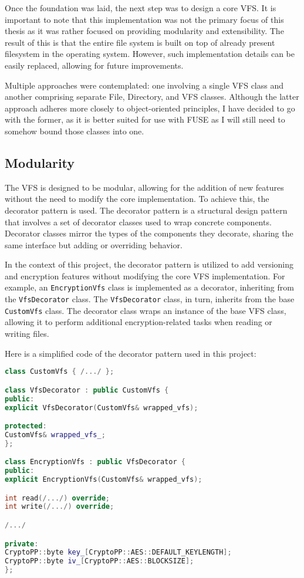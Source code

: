 Once the foundation was laid, the next step was to design a core VFS\@.
It is important to note that this implementation was not the primary focus of this thesis as it was rather focused on providing modularity and extensibility.
The result of this is that the entire file system is built on top of already present filesystem in the operating system.
However, such implementation details can be easily replaced, allowing for future improvements.

Multiple approaches were contemplated: one involving a single VFS class and another comprising separate File, Directory, and VFS classes.
Although the latter approach adheres more closely to object-oriented principles, I have decided to go with the former, as it is better suited for use with FUSE as I will still need to somehow bound those classes into one.

\subsection{Modularity}\label{subsec:modularity}

The VFS is designed to be modular, allowing for the addition of new features without the need to modify the core implementation.
To achieve this, the decorator pattern is used.
The decorator pattern is a structural design pattern that involves a set of decorator classes used to wrap concrete components.
Decorator classes mirror the types of the components they decorate, sharing the same interface but adding or overriding behavior.

In the context of this project, the decorator pattern is utilized to add versioning and encryption features without modifying the core VFS implementation.
For example, an \texttt{EncryptionVfs} class is implemented as a decorator, inheriting from the \texttt{VfsDecorator} class.
The \texttt{VfsDecorator} class, in turn, inherits from the base \texttt{CustomVfs} class.
The decorator class wraps an instance of the base VFS class, allowing it to perform additional encryption-related tasks when reading or writing files.

Here is a simplified code of the decorator pattern used in this project:

\begin{lstlisting}[language=c++, basicstyle=\ttfamily\small]
class CustomVfs { /.../ };

class VfsDecorator : public CustomVfs {
public:
explicit VfsDecorator(CustomVfs& wrapped_vfs);

protected:
CustomVfs& wrapped_vfs_;
};

class EncryptionVfs : public VfsDecorator {
public:
explicit EncryptionVfs(CustomVfs& wrapped_vfs);

int read(/.../) override;
int write(/.../) override;

/.../

private:
CryptoPP::byte key_[CryptoPP::AES::DEFAULT_KEYLENGTH];
CryptoPP::byte iv_[CryptoPP::AES::BLOCKSIZE];
};
\end{lstlisting}

